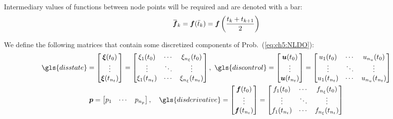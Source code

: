 \noindent Intermediary values of functions between node points will be required and are denoted with a bar:
\begin{align}
\myoverbar{\bm{f}}_k = \bm{f}(\bar{t}_k) =  \bm{f}\left(\frac{t_{k}+t_{k+1}}{2}\right) 
\end{align}

\noindent We define the following matrices that contain some discretized components of Prob.~(\ref{eq:ch5:NLDO}):
\begin{gather}
\begin{gathered}
\gls{disstate} = \begin{bmatrix}
\bm{\xi}(t_0) \\ \vdots \\ \bm{\xi}(t_{n_t}) \\
\end{bmatrix} = \begin{bmatrix}
\xi_1(t_0) & \cdots & \xi_{n_\xi}(t_0) \\
\vdots & \ddots & \vdots \\
\xi_{1}(t_{n_t}) & \cdots & \xi_{n_\xi}(t_{n_t})
\end{bmatrix},
%
\
%
\gls{discontrol} = \begin{bmatrix}
\bm{u}(t_0) \\ \vdots \\ \bm{u}(t_{n_t}) \\
\end{bmatrix} = \begin{bmatrix}
u_1(t_0) & \cdots & u_{n_u}(t_0) \\
\vdots & \ddots & \vdots \\
u_{1}(t_{n_t}) & \cdots & u_{n_u}(t_{n_t})
\end{bmatrix}
%
\\ 
\bm{p} = \begin{bmatrix}
p_1 & \cdots & p_{n_p}
\end{bmatrix},
% 
\quad
%
\gls{disderivative} = \begin{bmatrix}
\bm{f}(t_0) \\ \vdots \\ \bm{f}(t_{n_t}) \\
\end{bmatrix} = \begin{bmatrix}
{f}_1(t_0) & \cdots & {f}_{n_\xi}(t_0) \\
\vdots & \ddots & \vdots \\
{f}_{1}(t_{n_t}) & \cdots & {f}_{n_\xi}(t_{n_t})
\end{bmatrix}
\end{gathered}
\end{gather}

